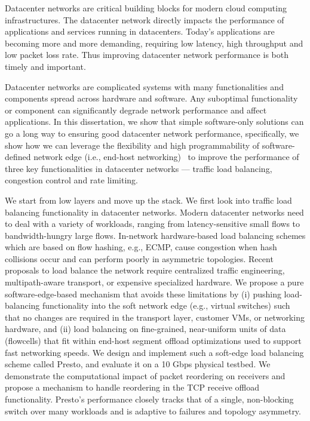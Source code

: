 
\vcinfo{}



Datacenter networks are critical building blocks for modern cloud computing 
infrastructures. The datacenter network directly impacts the performance of 
applications and services running in datacenters. Today's applications are 
becoming more and more demanding, requiring low latency, high throughput and low packet 
loss rate. 
Thus improving datacenter network performance is both timely and important.

Datacenter networks are complicated systems with many functionalities and components
spread across hardware and software. 
Any suboptimal functionality or component can significantly degrade network performance 
and affect applications.
In this dissertation, we show that simple software-only solutions can go a long way to 
ensuring good datacenter network performance, specifically, we show how we can leverage 
the flexibility and high programmability of software-defined network edge 
(i.e., end-host networking)~\cite{ovs-extending,pfaff2015design} to 
improve the performance of three key functionalities in datacenter networks --- traffic load balancing, 
congestion control and rate limiting.

We start from low layers and move up the stack.
We first look into traffic load balancing functionality in datacenter networks.
Modern datacenter networks need to deal with a variety of workloads, ranging
from latency-sensitive small flows to bandwidth-hungry
large flows. In-network hardware-based load balancing schemes which are based on flow hashing,
e.g., ECMP, cause congestion when hash collisions occur
and can perform poorly in asymmetric topologies. Recent
proposals to load balance the network require centralized
traffic engineering, multipath-aware transport, or expensive
specialized hardware. We propose a pure software-edge-based mechanism that
avoids these limitations by (i) pushing load-balancing functionality
into the soft network edge (e.g., virtual switches)
such that no changes are required in the transport layer, customer
VMs, or networking hardware, and (ii) load balancing
on fine-grained, near-uniform units of data (flowcells)
that fit within end-host segment offload optimizations used
to support fast networking speeds. We design and implement
such a soft-edge load balancing scheme called Presto, and
evaluate it on a 10 Gbps physical testbed. We demonstrate
the computational impact of packet reordering on receivers
and propose a mechanism to handle reordering in the TCP
receive offload functionality. Presto's performance closely
tracks that of a single, non-blocking switch over many workloads
and is adaptive to failures and topology asymmetry.

